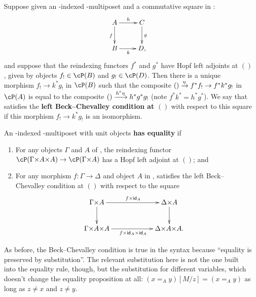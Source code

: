 \begin{defn}
  Suppose given an \cS-indexed \fS-multiposet \cP and a commutative square in \cS:
  \[ \xymatrix{ A \ar[r]^h \ar[d]_f & C \ar[d]^g \\ B \ar[r]_k & D, } \]
  and suppose that the reindexing functors $f^*$ and $g^*$ have Hopf left adjoints at $()$, given by objects $f_!\in \cP(B)$ and $g_!\in \cP(D)$.
  Then there is a unique morphism $f_! \to k^* g_!$ in $\cP(B)$ such that the composite $() \xrightarrow{\eta} f^* f_! \to f^* k^* g_!$ in $\cP(A)$ is equal to the composite $() \xrightarrow{h^* \eta} h^* g^* g_!$ (note $f^* k^* = h^* g^*$).
  We say that \cP satisfies the \textbf{left Beck--Chevalley condition at $()$} with respect to this square if this morphism $f_! \to k^* g_!$ is an isomorphism.
\end{defn}


\begin{defn}
  An \cS-indexed \fS-multiposet with unit objects \textbf{has equality} if
  \begin{enumerate}
  \item For any objects $\Gamma$ and $A$ of \cS, the reindexing functor $\cP(\Gamma\times A\times A) \to \cP(\Gamma\times A)$ has a Hopf left adjoint at $()$; and
  \item For any morphism $f:\Gamma\to\Delta$ and object $A$ in \cS, \cP satisfies the left Beck--Chevalley condition at $()$ with respect to the square
    \[ \xymatrix@C=5pc{ \Gamma\times A \ar[r]^{f\times \idfunc_A} \ar[d] & \Delta\times A \ar[d] \\
      \Gamma\times A\times A \ar[r]_{f\times \idfunc_A \times \idfunc_A} & \Delta\times A\times A. } \]
  \end{enumerate}
\end{defn}

As before, the Beck--Chevalley condition is true in the syntax because ``equality is preserved by substitution''.
The relevant substitution here is not the one built into the equality rule, though, but the substitution for different variables, which doesn't change the equality proposition at all: $(x=_A y)[M/z] = (x=_A y)$ as long as $z\neq x$ and $z\neq y$.

